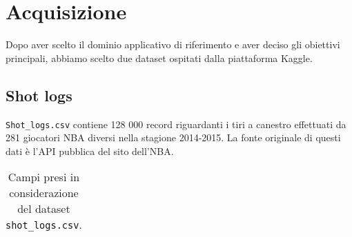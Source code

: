\section{Acquisizione}

Dopo aver scelto il dominio applicativo di riferimento e aver deciso gli obiettivi principali, abbiamo scelto due dataset ospitati dalla piattaforma Kaggle.

\subsection{Shot logs}


\texttt{Shot\_logs.csv} contiene 128 000 record riguardanti i tiri a canestro effettuati da 281 giocatori NBA diversi nella stagione 2014-2015. La fonte originale di questi dati è l’API pubblica del sito dell’NBA.
\begin{center}
	\begin{longtable}[m]{|m{8em} m{7em} m{16em}|} 

		\caption{Campi presi in considerazione del dataset \texttt{shot\_logs.csv}.\label{long}}\\


\end{longtable}
\end{center}
